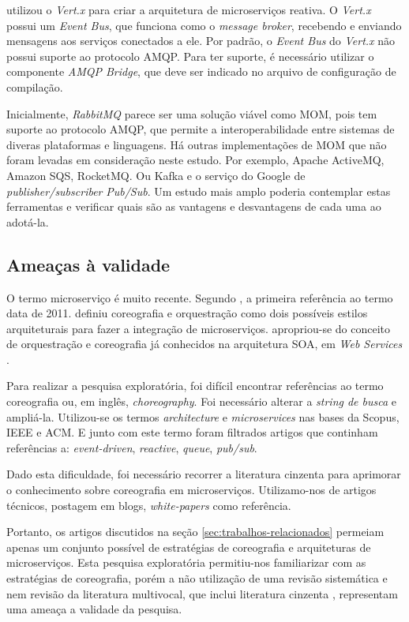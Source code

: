 \documentclass[12pt]{article}
\theoremstyle{plain}
\begin{document}
\cite{Abdelouahed:2018} utilizou o \textit{Vert.x} para criar a arquitetura de microserviços reativa. O \textit{Vert.x} possui um \textit{Event Bus}, que funciona como o \textit{message broker}, recebendo e enviando mensagens aos serviços conectados a ele. Por padrão, o \textit{Event Bus} do \textit{Vert.x} não possui suporte ao protocolo AMQP. Para ter suporte, é necessário utilizar o componente \textit{AMQP Bridge}, que deve ser indicado no arquivo de configuração de compilação.

Inicialmente, \textit{RabbitMQ} parece ser uma solução viável como MOM, pois tem suporte ao protocolo AMQP, que permite a interoperabilidade entre sistemas de diveras plataformas e linguagens. Há outras implementações de MOM que não foram levadas em consideração neste estudo. Por exemplo, Apache ActiveMQ, Amazon SQS, RocketMQ. Ou Kafka e o serviço do Google de \textit{publisher/subscriber} \textit{Pub/Sub}. Um estudo mais amplo poderia contemplar estas ferramentas e verificar quais são as vantagens e desvantagens de cada uma ao adotá-la.

\subsection{Ameaças à validade}

O termo microserviço é muito recente. Segundo \cite{Dragoni2017}, a primeira referência ao termo data de 2011. \cite{Newman:15} definiu coreografia e orquestração como dois possíveis estilos arquiteturais para fazer a integração de microserviços. \cite{Newman:15} apropriou-se do conceito de orquestração e coreografia já conhecidos na arquitetura SOA, em \textit{Web Services} \cite{Peltz:2003}. 

Para realizar a pesquisa exploratória, foi difícil encontrar referências ao termo coreografia ou, em inglês, \textit{choreography}. Foi necessário alterar a \textit{string de busca} e ampliá-la. Utilizou-se os termos \textit{architecture} e \textit{microservices} nas bases da Scopus, IEEE e ACM. E junto com este termo foram filtrados artigos que continham referências a: \textit{event-driven}, \textit{reactive}, \textit{queue}, \textit{pub/sub}.

Dado esta dificuldade, foi necessário recorrer a literatura cinzenta \cite{botelho:2017} para aprimorar o conhecimento sobre coreografia em microserviços. Utilizamo-nos de artigos técnicos, postagem em blogs, \textit{white-papers} como referência. 

Portanto, os artigos discutidos na seção \ref{sec:trabalhos-relacionados} permeiam apenas um conjunto possível de estratégias de coreografia e arquiteturas de microserviços. Esta pesquisa exploratória permitiu-nos familiarizar com as estratégias de coreografia, porém a não utilização de uma revisão sistemática e nem revisão da literatura multivocal, que inclui literatura cinzenta \cite{GAROUSI2018}, representam uma ameaça a validade da pesquisa.
\end{document}
